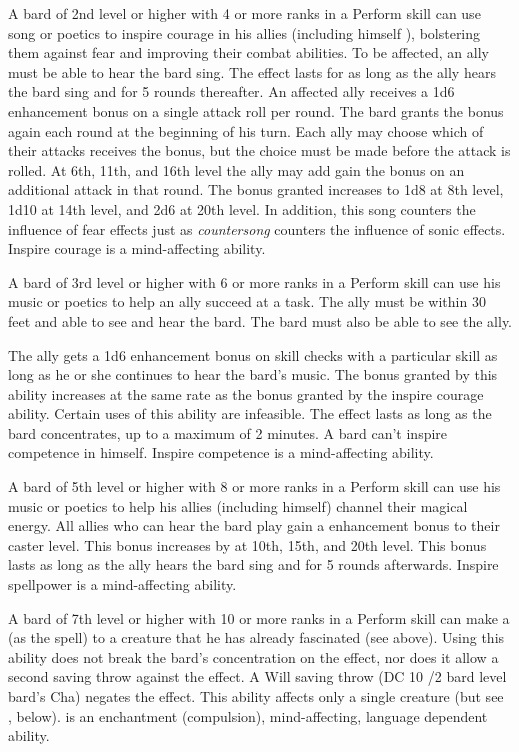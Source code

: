   A bard of 2nd level or higher with 4 or more ranks in a Perform skill can use song or poetics to inspire courage in his allies (including himself ), bolstering them against fear and improving their combat abilities. To be affected, an ally must be able to hear the bard sing. The effect lasts for as long as the ally hears the bard sing and for 5 rounds thereafter. An affected ally receives a \plus1d6 enhancement bonus on a single attack roll per round. The bard grants the bonus again each round at the beginning of his turn. Each ally may choose which of their attacks receives the bonus, but the choice must be made before the attack is rolled. At 6th, 11th, and 16th level the ally may add gain the bonus on an additional attack in that round. The bonus granted increases to 1d8 at 8th level, 1d10 at 14th level, and 2d6 at 20th level. In addition, this song counters the influence of fear effects just as \emph{countersong} counters the influence of sonic effects. Inspire courage is a mind-affecting ability.

   A bard of 3rd level or higher with 6 or more ranks in a Perform skill can use his music or poetics to help an ally succeed at a task. The ally must be within 30 feet and able to see and hear the bard. The bard must also be able to see the ally.

The ally gets a \plus1d6 enhancement bonus on skill checks with a particular skill as long as he or she continues to hear the bard's music. The bonus granted by this ability increases at the same rate as the bonus granted by the inspire courage ability. Certain uses of this ability are infeasible. The effect lasts as long as the bard concentrates, up to a maximum of 2 minutes. A bard can't inspire competence in himself. Inspire competence is a mind-affecting ability.

  A bard of 5th level or higher with 8 or more ranks in
a Perform skill can use his music or poetics to help his allies (including himself) channel their magical
energy. All allies who can hear the bard play gain a  enhancement bonus to their caster level. This bonus increases by  at 10th, 15th, and 20th level. This bonus lasts as long as the ally hears the bard sing and for 5 rounds afterwards. Inspire spellpower is a mind-affecting ability.

  A bard of 7th level or higher with 10 or more ranks in a Perform skill can make a  (as the spell) to a creature
that he has already fascinated (see above). Using this ability does not
break the bard's concentration on the  effect, nor does it
allow a second saving throw against the  effect. A Will saving throw (DC 10 /2 bard level \add bard's Cha) negates the effect. This ability affects only a single creature (but see , below).  is an enchantment (compulsion), mind-affecting, language dependent ability.

